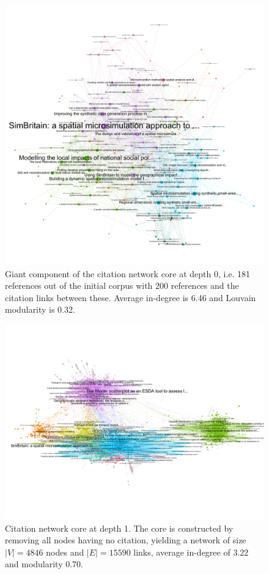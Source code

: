 \documentclass[11pt]{article}
\begin{document}
\begin{figure}
  \includegraphics[width=\linewidth]{figures/microsim_depth0.png}
  \caption{Giant component of the citation network core at depth 0, i.e. 181 references out of the initial corpus with 200 references and the citation links between these. Average in-degree is 6.46 and Louvain modularity is 0.32.}
  \label{fig:citnwdepth0}
\end{figure}


\begin{figure}
  \includegraphics[width=\linewidth]{figures/microsim_depth1.png}
  \caption{Citation network core at depth 1. The core is constructed by removing all nodes having no citation, yielding a network of size $\left|V\right|=4846$ nodes and $\left|E\right|=15590$ links, average in-degree of 3.22 and modularity 0.70.}
  \label{fig:citnwdepth1}
\end{figure}
\end{document}
